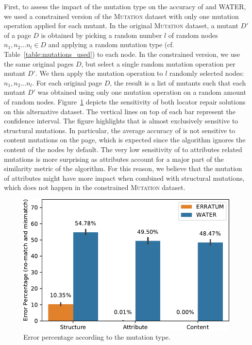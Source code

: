 \documentclass[preprint, 12pt]{elsarticle}
\begin{document}
First, to assess the impact of the mutation type on the accuracy of \erratum and WATER, we used a constrained version of the \textsc{Mutation} dataset with only one mutation operation applied for each mutant. 	
In the original \textsc{Mutation} dataset, a mutant $D'$ of a page $D$ is obtained by picking a random number $l$ of random nodes $n_1, n_2...n_l \in D$ and applying a random mutation type (cf. Table~\ref{table:mutations_used}) to each node.
In the constrained version, we use the same original pages $D$, but select a single random mutation operation per mutant $D'$.
We then apply the mutation operation to $l$ randomly selected nodes: $n_1, n_2...n_l$. 
For each original page $D$, the result is a list of mutants such that each mutant $D'$ was obtained using only one mutation operation on a random amount of random nodes.
Figure~\ref{fig:mutationTypeAnalysis} depicts the sensitivity of both locator repair solutions on this alternative dataset.
The vertical lines on top of each bar represent the confidence interval.
The figure highlights that \erratum is almost exclusively sensitive to structural mutations.
In particular, the average accuracy of \erratum is not sensitive to content mutations on the page, which is expected since the algorithm ignores the content of the nodes by default.
The very low sensitivity of \erratum to attributes related mutations is more surprising as attributes account for a major part of the similarity metric of the algorithm.
For this reason, we believe that the mutation of attributes might have more impact when combined with structural mutations, which does not happen in the constrained \textsc{Mutation} dataset.

\begin{figure}[]
  \centering
  \includegraphics[width=.8\linewidth]{mutationTypeAnalysis}
  \caption{Error percentage according to the mutation type.}
  \label{fig:mutationTypeAnalysis}
\end{figure}
\end{document}
